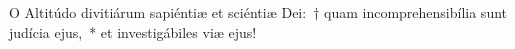 
\lettrine{O}{} Altitúdo divitiárum sapiéntiæ et sciéntiæ Dei:~† quam incomprehensibília sunt judícia ejus,~* et investigábiles viæ ejus!